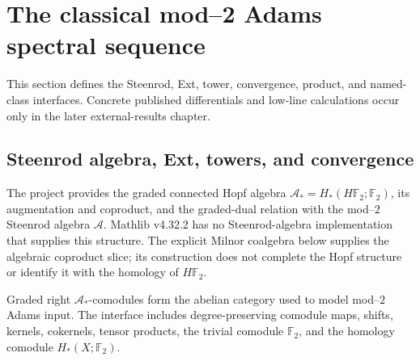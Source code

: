 \section{The classical mod--2 Adams spectral sequence}
\label{chap:classical-adams}

This section defines the Steenrod, Ext, tower, convergence, product, and named-class interfaces.  Concrete published differentials and low-line calculations occur only in the later external-results chapter.

\subsection{Steenrod algebra, Ext, towers, and convergence}

\begin{definition}
  \label{def:dual-steenrod-algebra}
  \notready
  The project provides the graded connected Hopf algebra
  $\mathcal A_*=H_*(H\mathbb F_2;\mathbb F_2)$, its augmentation and coproduct,
  and the graded-dual relation with the mod--$2$ Steenrod algebra $\mathcal A$.
  Mathlib v4.32.2 has no Steenrod-algebra implementation that supplies this
  structure.
  The explicit Milnor coalgebra below supplies the algebraic coproduct
  slice; its construction does not complete the Hopf structure or identify
  it with the homology of $H\mathbb F_2$.
\end{definition}

\begin{definition}
  \label{def:steenrod-comodule-category}
  \notready
  Graded right $\mathcal A_*$-comodules form the abelian category used to model
  mod--$2$ Adams input.  The interface includes degree-preserving comodule
  maps, shifts, kernels, cokernels, tensor products, the trivial comodule
  $\mathbb F_2$, and the homology comodule $H_*(X;\mathbb F_2)$.
\end{definition}

